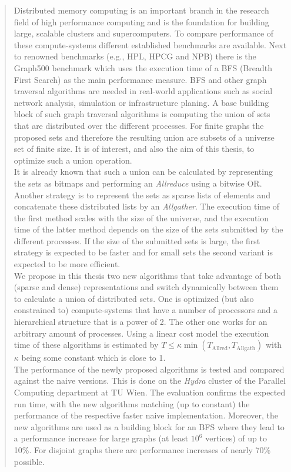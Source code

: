 \documentclass[final,oneside]{vutinfth}
\begin{document}
	\begin{abstract}
		Distributed memory computing is an important branch in the research field of high performance computing and is the foundation for building large, scalable clusters and supercomputers. To compare performance of these compute-systems different established benchmarks are available. Next to renowned benchmarks (e.g., HPL, HPCG  and NPB) there is the Graph500 benchmark which uses the execution time of a BFS (Breadth First Search) as the main performance measure. BFS and other graph traversal algorithms are needed in real-world applications such as social network analysis, simulation or infrastructure planing. A base building block of such graph traversal algorithms is computing the union of sets that are distributed over the different processes. For finite graphs the proposed sets and therefore the resulting union are subsets of a universe set of finite size.  It is of interest, and also the aim of this thesis, to optimize such a union operation.\\
		It is already known that such a union can be calculated by representing the sets as bitmaps and performing an \emph{Allreduce} using a bitwise OR. Another strategy is to represent the sets as sparse lists of elements and concatenate these distributed lists by an \emph{Allgather}. The execution time of the first method scales with the size of the universe, and the execution time of the latter method depends on the size of the sets submitted by the different processes. If the size of the submitted sets is large, the first strategy is expected to be faster  and for small sets the second variant is expected to be more efficient.\\
		We propose in this thesis two new algorithms that take advantage of both (sparse and dense) representations and switch dynamically between them to calculate a union of distributed sets. One is optimized (but also constrained to) compute-systems that have a number of processors and a hierarchical structure that is a power of 2. The other one works for an arbitrary amount of processes. Using a linear cost model the execution time of these algorithms is estimated by $T \leq \kappa \min(T_\mathrm{Allred}, T_\mathrm{Allgath})$ with $\kappa$ being some constant which is close to 1. \\
		The performance of the newly proposed algorithms is tested and compared against the naive versions. This is done on the \emph{Hydra} cluster of the Parallel Computing department at TU Wien. The evaluation confirms the expected run time,  with the new algorithms matching (up to constant) the performance of the respective faster naive implementation. Moreover, the new algorithms are used as a building block for an BFS where they lead to a performance increase for large graphs (at least $10^6$ vertices) of up to 10\%. For disjoint graphs there are performance increases of nearly 70\% possible.
	\end{abstract}
	
\end{document}
